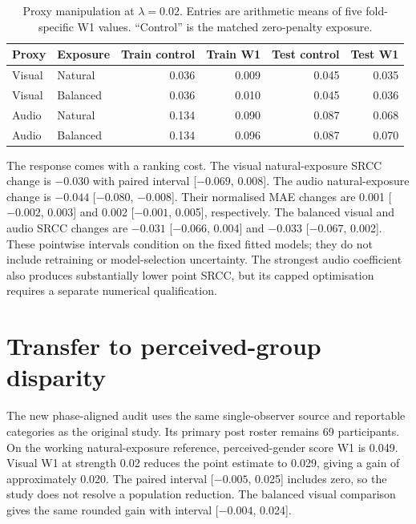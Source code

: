 \begin{table}[htbp]
\centering
\caption{Proxy manipulation at $\lambda=0.02$. Entries are arithmetic means of five
fold-specific W1 values. ``Control'' is the matched zero-penalty exposure.}
\label{tab:compact-manipulation}
\small
\begin{tabular}{llrrrr}
\toprule
Proxy & Exposure & Train control & Train W1 & Test control & Test W1 \\
\midrule
Visual & Natural & 0.036 & 0.009 & 0.045 & 0.035 \\
Visual & Balanced & 0.036 & 0.010 & 0.045 & 0.036 \\
Audio & Natural & 0.134 & 0.090 & 0.087 & 0.068 \\
Audio & Balanced & 0.134 & 0.096 & 0.087 & 0.070 \\
\bottomrule
\end{tabular}
\end{table}
\FloatBarrier

The response comes with a ranking cost. The visual natural-exposure SRCC change is
$-0.030$ with paired interval [$-0.069$, 0.008]. The audio natural-exposure change is
$-0.044$ [$-0.080$, $-0.008$]. Their normalised MAE changes are 0.001
[$-0.002$, 0.003] and 0.002 [$-0.001$, 0.005], respectively.
The balanced visual and audio SRCC changes are $-0.031$ [$-0.066$, 0.004] and
$-0.033$ [$-0.067$, 0.002]. These pointwise intervals condition on the fixed fitted
models; they do not include retraining or model-selection uncertainty. The strongest audio
coefficient also produces substantially lower point SRCC, but its capped optimisation
requires a separate numerical qualification.

\section{Transfer to perceived-group disparity}
\label{sec:compact-audit-results}

The new phase-aligned audit uses the same single-observer source and reportable categories
as the original study. Its primary post roster remains 69 participants. On the working
natural-exposure reference, perceived-gender score W1 is 0.049. Visual W1 at strength 0.02
reduces the point estimate to 0.029, giving a gain of approximately 0.020. The paired
interval [$-0.005$, 0.025] includes zero, so the study does not resolve a population
reduction. The balanced visual comparison gives the same rounded gain with interval
[$-0.004$, 0.024].

